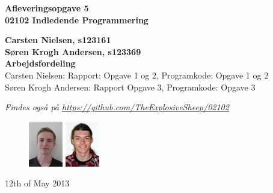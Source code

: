 \thispagestyle{empty} %
\begin{center}
\textbf{\Huge {Afleveringsopgave 5}\\ \vspace{1cm}
\huge{02102 Indledende Programmering}}
\end{center}
\vspace{1cm}
\begin{center}
\Large{\textbf{Carsten Nielsen, s123161 \\ Søren Krogh Andersen, s123369}} \\
\vspace{1cm}
\Large{\textbf{Arbejdsfordeling}} \\
Carsten Nielsen: Rapport: Opgave 1 og 2, Programkode: Opgave 1 og 2 \\
Søren Krogh Andersen: Rapport Opgave 3, Programkode: Opgave 3

\emph{Findes også på \url{https://github.com/TheExplosiveSheep/02102}}
\end{center}
\vspace{6cm}
\begin{figure}[h]
\hfill
\includegraphics{pictures/s123161.png}%
\includegraphics{pictures/s123369.png}%
\end{figure}
12th of May 2013

\thispagestyle{empty}
\newpage

